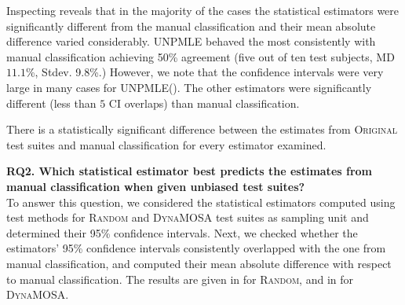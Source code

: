 \documentclass[sigconf,review,anonymous]{acmart}
\newcommand{\projectCount}{ten\xspace}
\newcommand{\Unpmle}{UNPMLE\xspace}
\newcommand{\original}{\textsc{Original}\xspace}
\newcommand{\EvosuiteRandom}{\textsc{Random}\xspace}
\newcommand{\EvosuiteDynamosa}{\textsc{DynaMOSA}\xspace}
\begin{document}
Inspecting  reveals that in the majority of the cases the
statistical estimators were significantly different from the manual classification
and their mean absolute difference varied considerably.
\Unpmle behaved the most consistently with manual classification
achieving 50\% agreement (five out of \projectCount test subjects,
MD $11.1$\%, Stdev. 9.8\%.) However, we note that the confidence
intervals were very large in many cases for \Unpmle ().
%
%
The other estimators were significantly different %
(less than $5$ CI overlaps)
 than manual classification.

\begin{tcolorbox}[boxrule=0.5pt, arc=4pt, boxsep=0pt, width=\columnwidth]
There is a statistically significant difference between the estimates
from \original test suites and manual classification for
every estimator examined.
\end{tcolorbox}

\noindent\textbf{RQ2. Which statistical estimator best predicts the estimates
from manual classification when given unbiased test suites?}\\
%
To answer this question, we considered the statistical estimators computed
using test methods for \EvosuiteRandom and \EvosuiteDynamosa test suites as sampling unit
and determined their 95\% confidence intervals.
%
Next, we checked whether the estimators' 95\% confidence intervals consistently
overlapped with the one from manual classification, and computed their mean absolute
difference with respect to manual classification.
%
The results are given in  for \EvosuiteRandom, and in
 for \EvosuiteDynamosa.
\end{document}
